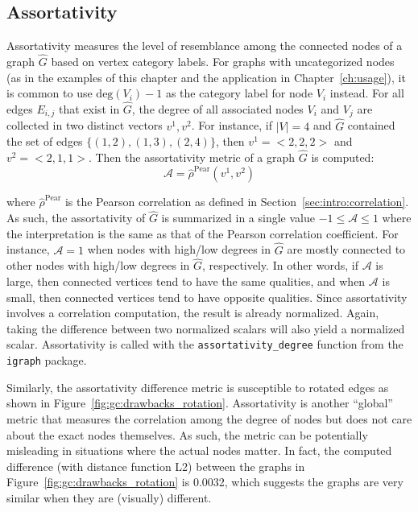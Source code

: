 \subsection{Assortativity}

Assortativity measures the level of resemblance among the connected nodes of a 
graph $\hat{G}$ based on vertex category labels. For graphs with uncategorized 
nodes (as in the examples of this chapter and the 
application in Chapter~\ref{ch:usage}), it is common to use $\text{deg}(V_i)-1$
as the category label for node $V_i$ instead. For all edges $E_{i,j}$ that 
exist in $\hat{G}$, the degree of all associated nodes $V_i$ and $V_j$ are 
collected in two distinct vectors $v^1, v^2$. For instance, if $|V| = 4$ and 
$\hat{G}$ contained the set of edges $\{(1,2), (1,3), (2,4)\}$, then $v^1 = 
<2,2,2>$ and $v^2 = <2,1,1>$. Then the assortativity metric of a graph 
$\hat{G}$ is computed:
$$\mathcal{A} = \hat{\rho}^\text{Pear}(v^1,v^2)$$

\noindent where $\hat{\rho}^\text{Pear}$ is the Pearson 
correlation as defined in Section~\ref{sec:intro:correlation}. As such, 
the assortativity of $\hat{G}$ is summarized in a single value 
$-1 \leq \mathcal{A} \leq 1$ where the interpretation is the same as that of 
the Pearson correlation coefficient. For instance, $\mathcal{A}=1$ when nodes 
with high/low degrees in $\hat{G}$ are mostly connected to other nodes with 
high/low degrees in $\hat{G}$, respectively. In other words, if 
$\mathcal{A}$ is large, then connected vertices tend to have the same 
qualities, and when $\mathcal{A}$ is small, then connected vertices tend to 
have opposite qualities. Since assortativity involves a correlation 
computation, the result is already normalized. Again, taking the difference 
between two normalized scalars will also yield a normalized scalar.
Assortativity is called with the \texttt{assortativity\_degree} function from 
the \texttt{igraph} package.

Similarly, the assortativity difference metric is susceptible to rotated edges 
as shown in Figure~\ref{fig:gc:drawbacks_rotation}. Assortativity is another 
``global'' metric that measures the correlation among the degree of nodes but 
does not care about the exact nodes themselves. As such, the metric can be 
potentially misleading in situations where the actual nodes matter. In fact, 
the computed difference (with distance function L2) between the graphs in 
Figure~\ref{fig:gc:drawbacks_rotation} is 0.0032, which suggests the graphs are 
very similar when they are (visually) different.







